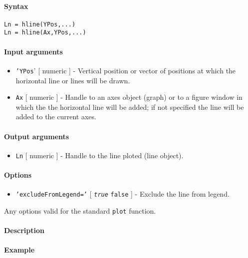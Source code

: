 


	\paragraph{Syntax}

\begin{verbatim}
Ln = hline(YPos,...)
Ln = hline(Ax,YPos,...)
\end{verbatim}

\paragraph{Input arguments}

\begin{itemize}
\item
  \texttt{'YPos}' {[} numeric {]} - Vertical position or vector of
  positions at which the horizontal line or lines will be drawn.
\item
  \texttt{Ax} {[} numeric {]} - Handle to an axes object (graph) or to a
  figure window in which the the horizontal line will be added; if not
  specified the line will be added to the current axes.
\end{itemize}

\paragraph{Output arguments}

\begin{itemize}
\itemsep1pt\parskip0pt
\item
  \texttt{Ln} {[} numeric {]} - Handle to the line ploted (line object).
\end{itemize}

\paragraph{Options}

\begin{itemize}
\itemsep1pt\parskip0pt
\item
  \texttt{'excludeFromLegend='} {[} \emph{\texttt{true}} \textbar{}
  \texttt{false} {]} - Exclude the line from legend.
\end{itemize}

Any options valid for the standard \texttt{plot} function.

\paragraph{Description}

\paragraph{Example}


